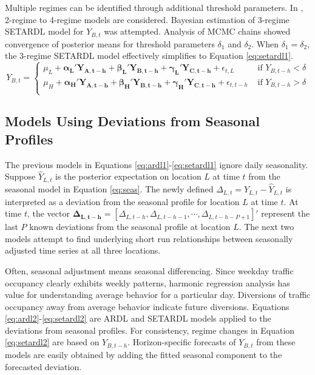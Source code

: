 Multiple regimes can be identified through additional threshold parameters. In \cite{Kamarianakis2010}, 2-regime to 4-regime models are considered. Bayesian estimation of  3-regime SETARDL model for $Y_{B,t}$ was attempted. Analysis of MCMC chains showed convergence of posterior means for threshold parameters $\delta_1$ and $\delta_2$. When $\delta_1=\delta_2$, the 3-regime SETARDL model effectively simplifies to Equation \ref{eq:setardl1}.
\begin{equation}
\label{eq:setardl1}
Y_{B,t}=
  \begin{cases}
    \mu_L+\bm{\alpha_L}'\bm{Y_{A,t-h}}+\bm{\beta_L}'\bm{Y_{B,t-h}}+\bm{\gamma_L}'\bm{Y_{C,t-h}}+\epsilon_{t,L} & \textrm{ if } Y_{B,t-h}<\delta \\
    \mu_H+\bm{\alpha_H}'\bm{Y_{A,t-h}}+\bm{\beta_H}'\bm{Y_{B,t-h}}+\bm{\gamma_H}'\bm{Y_{C,t-h}}+\epsilon_{t,t-h} & \textrm{ if } Y_{B,t-h}>\delta \\
  \end{cases}
\end{equation}

\subsection{Models Using Deviations from Seasonal Profiles}
The previous models in Equations \ref{eq:ardl1}-\ref{eq:setardl1} ignore daily seasonality. Suppose $\widehat{Y}_{L,t}$ is the posterior expectation on location $L$ at time $t$ from the seasonal model in Equation \ref{eq:seas}. The newly defined  $\Delta_{L,t}=Y_{L,t}-\widehat{Y}_{L,t}$ is interpreted as a deviation from the seasonal profile for location $L$ at time $t$. At time $t$, the vector $\bm{\Delta_{L,t-h}}=[\Delta_{L,t-h},\Delta_{L,t-h-1},\cdots,\Delta_{L,t-h-P+1}]'$ represent the last $P$ known deviations from the seasonal profile at location $L$. The next two models attempt to find underlying short run relationships between seasonally adjusted time series at all three locations.

Often, seasonal adjustment means seasonal differencing. Since weekday traffic occupancy clearly exhibits weekly patterns, harmonic regression analysis has value for understanding average behavior for a particular day. Diversions of traffic occupancy away from average behavior indicate future diversions.  Equations \ref{eq:ardl2}-\ref{eq:setardl2} are ARDL and SETARDL models applied to the deviations from seasonal profiles. For consistency, regime changes in Equation \ref{eq:setardl2} are based on $Y_{B,t-h}$. Horizon-specific forecasts of $Y_{B,t}$ from these models are easily obtained by adding the fitted seasonal component to the forecasted deviation. 

